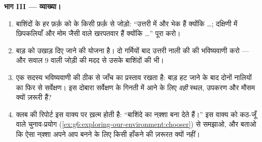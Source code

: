 \begin{problem}
\medskip\noindent\textbf{भाग III --- व्याख्या।}
\begin{enumerate}[resume]
  \item बाशिंदों के हर फ़र्क़ को  के किसी फ़र्क़ से जोड़ो:
        ``उत्तरी में  और भेक हैं क्योंकि \dots; दक्षिणी में छिपकलियाँ और मोम
        जैसी  वाले खरपतवार हैं क्योंकि \dots'' पूरा करो।
  \item बाड़ को उखाड़ दिए जाने की योजना है। दो गर्मियों बाद उत्तरी नाली की
         की भविष्यवाणी करो --- और सवाल 9 वाली जोड़ी की
        मदद से उसके बाशिंदों की भी।
  \item एक सदस्य भविष्यवाणी की ठीक से जाँच का प्रस्ताव रखता है: बाड़
        हट जाने के बाद दोनों नालियों का फिर से सर्वेक्षण। इस दोबारा
        सर्वेक्षण के गिनती में आने के लिए \emph{वही} स्थल, उपकरण और
        मौसम क्यों ज़रूरी हैं?
  \item क्लब की रिपोर्ट इस वाक्य पर ख़त्म होती है: ``बाशिंदे
         का नक़्शा बना देते हैं।'' इस वाक्य को कठ-जूँ वाले
        चुनाव-प्रयोग (\cref{ex:g6:exploring-our-environment:chooser})
        से समझाओ, और बताओ कि ऐसा नक़्शा अपने आप बनने के लिए किसी हाँकने
        की ज़रूरत क्यों नहीं।
\end{enumerate}
\end{problem}

